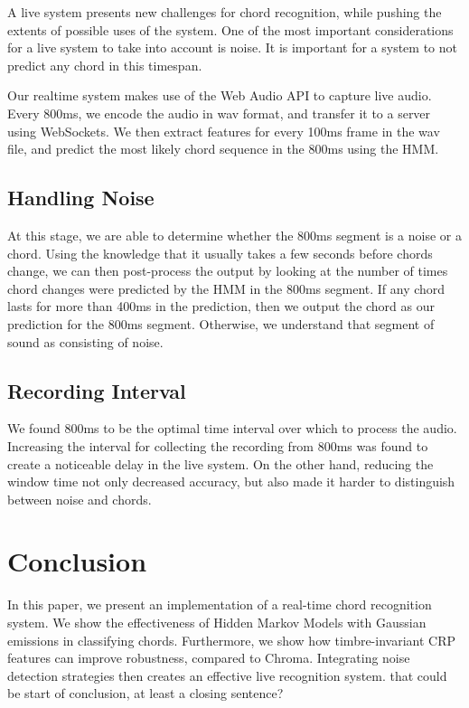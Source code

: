 \documentclass{article}
\begin{document}
A live system presents new challenges for chord recognition, while pushing the
extents of possible uses of the system.
One of the most important considerations for a live system to take into account
is noise. It is important for a system to not predict any chord in this
timespan.

Our realtime system makes use of the Web Audio API to capture live audio. Every
800ms, we encode the audio in wav format, and transfer it to a server using
WebSockets. We then extract features for every 100ms frame in the wav file, and
predict the most likely chord sequence in the 800ms using the HMM.

\subsection{Handling Noise}
At this stage, we are able to determine whether the 800ms segment is a noise or
a chord. Using the knowledge that it usually takes a few seconds before chords
change, we can then post-process the output by looking at the number of times
chord changes were predicted by the HMM in the 800ms segment. If any chord lasts
for more than 400ms in the prediction, then we output the chord as our
prediction for the 800ms segment. Otherwise, we understand that segment of sound
as consisting of noise.

\subsection{Recording Interval}
We found 800ms to be the optimal time interval over which to process the audio. Increasing the interval 
for collecting the recording from 800ms was found to create a noticeable delay in the live system. On the other hand, reducing the window time not only decreased accuracy, but also made it harder to distinguish between noise and chords.

\section{Conclusion}
In this paper, we present an implementation of a real-time chord recognition system. We show the effectiveness of Hidden Markov Models with Gaussian emissions in classifying chords. Furthermore, we show how timbre-invariant CRP features can improve robustness, compared to Chroma. Integrating noise detection strategies then creates an effective live recognition system.
that could be start of conclusion, at least a closing sentence?




\end{document}
